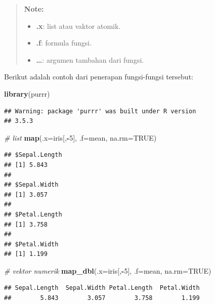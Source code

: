 \documentclass[]{book}
\newenvironment{Shaded}{\begin{snugshade}}{\end{snugshade}}
\newcommand{\KeywordTok}[1]{\textcolor[rgb]{0.13,0.29,0.53}{\textbf{#1}}}
\newcommand{\DataTypeTok}[1]{\textcolor[rgb]{0.13,0.29,0.53}{#1}}
\newcommand{\DecValTok}[1]{\textcolor[rgb]{0.00,0.00,0.81}{#1}}
\newcommand{\CommentTok}[1]{\textcolor[rgb]{0.56,0.35,0.01}{\textit{#1}}}
\newcommand{\OtherTok}[1]{\textcolor[rgb]{0.56,0.35,0.01}{#1}}
\newcommand{\OperatorTok}[1]{\textcolor[rgb]{0.81,0.36,0.00}{\textbf{#1}}}
\newcommand{\NormalTok}[1]{#1}
\providecommand{\tightlist}{%
  \setlength{\itemsep}{0pt}\setlength{\parskip}{0pt}}
\begin{document}
\begin{quote}
\textbf{Note: }

\begin{itemize}
\tightlist
\item
  \textbf{.x}: list atau vaktor atomik.
\item
  \textbf{.f}: formula fungsi.
\item
  \textbf{\ldots{}}: argumen tambahan dari fungsi.
\end{itemize}
\end{quote}

Berikut adalah contoh dari penerapan fungsi-fungsi tersebut:

\begin{Shaded}
\begin{Highlighting}[]
\KeywordTok{library}\NormalTok{(purrr)}
\end{Highlighting}
\end{Shaded}

\begin{verbatim}
## Warning: package 'purrr' was built under R version
## 3.5.3
\end{verbatim}

\begin{Shaded}
\begin{Highlighting}[]
\CommentTok{# list}
\KeywordTok{map}\NormalTok{(}\DataTypeTok{.x=}\NormalTok{iris[,}\OperatorTok{-}\DecValTok{5}\NormalTok{], }\DataTypeTok{.f=}\NormalTok{mean, }\DataTypeTok{na.rm=}\OtherTok{TRUE}\NormalTok{)}
\end{Highlighting}
\end{Shaded}

\begin{verbatim}
## $Sepal.Length
## [1] 5.843
## 
## $Sepal.Width
## [1] 3.057
## 
## $Petal.Length
## [1] 3.758
## 
## $Petal.Width
## [1] 1.199
\end{verbatim}

\begin{Shaded}
\begin{Highlighting}[]
\CommentTok{# vektor numerik}
\KeywordTok{map_dbl}\NormalTok{(}\DataTypeTok{.x=}\NormalTok{iris[,}\OperatorTok{-}\DecValTok{5}\NormalTok{], }\DataTypeTok{.f=}\NormalTok{mean, }\DataTypeTok{na.rm=}\OtherTok{TRUE}\NormalTok{)}
\end{Highlighting}
\end{Shaded}

\begin{verbatim}
## Sepal.Length  Sepal.Width Petal.Length  Petal.Width 
##        5.843        3.057        3.758        1.199
\end{verbatim}
\end{document}
